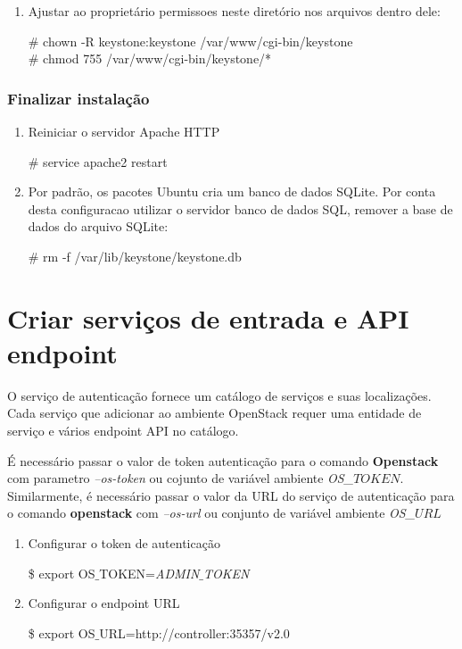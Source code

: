 \begin{enumerate}
			\item Ajustar ao proprietário permissoes neste diretório nos arquivos dentro dele:
			\begin{snugshade}
				\# chown -R keystone:keystone /var/www/cgi-bin/keystone \\
				\# chmod 755 /var/www/cgi-bin/keystone/*
			\end{snugshade}
		\end{enumerate}		
		
		\subsubsection{Finalizar instalação}
		\begin{enumerate}
			\item Reiniciar o servidor Apache HTTP
			\begin{snugshade}
			\#	service apache2 restart
			\end{snugshade}
			\item Por padrão, os pacotes Ubuntu cria um banco de dados SQLite. 
			Por conta desta configuracao utilizar o servidor banco de dados SQL, remover a base de dados do arquivo SQLite:
			\begin{snugshade}
				\# rm -f /var/lib/keystone/keystone.db
			\end{snugshade}
		\end{enumerate}
		
\section{Criar serviços de entrada e API endpoint}
O serviço de autenticação fornece um catálogo de serviços e suas localizações. Cada serviço que adicionar ao ambiente OpenStack requer uma entidade de serviço e vários endpoint API no catálogo.

É necessário passar o valor de token autenticação para o comando \textbf{Openstack} com parametro \emph{--os-token} ou cojunto de variável ambiente \emph{OS\_$TOKEN$}. Similarmente, é necessário passar o valor da URL do serviço de autenticação para o comando \textbf{openstack} com  \emph{--os-url} ou conjunto de variável ambiente \emph{OS\_$URL$}
\begin{enumerate}
	\item Configurar o token de autenticação 
	\begin{snugshade}
		\$ export OS$\_$TOKEN=\emph{ADMIN$\_$TOKEN}
	\end{snugshade}
	
	\item Configurar o endpoint URL
	\begin{snugshade}
		\$ export OS$\_$URL=http://controller:35357/v2.0
	\end{snugshade}	
\end{enumerate}

